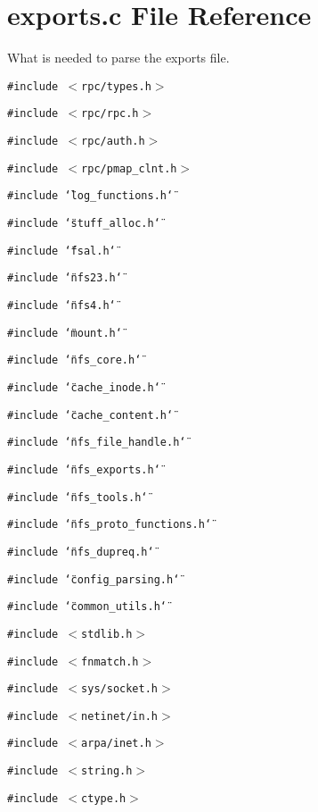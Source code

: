 \section{exports.c File Reference}
\label{exports_8c}
What is needed to parse the exports file. 

{\tt \#include $<$rpc/types.h$>$}\par
{\tt \#include $<$rpc/rpc.h$>$}\par
{\tt \#include $<$rpc/auth.h$>$}\par
{\tt \#include $<$rpc/pmap\_\-clnt.h$>$}\par
{\tt \#include \char`\"{}log\_\-functions.h\char`\"{}}\par
{\tt \#include \char`\"{}stuff\_\-alloc.h\char`\"{}}\par
{\tt \#include \char`\"{}fsal.h\char`\"{}}\par
{\tt \#include \char`\"{}nfs23.h\char`\"{}}\par
{\tt \#include \char`\"{}nfs4.h\char`\"{}}\par
{\tt \#include \char`\"{}mount.h\char`\"{}}\par
{\tt \#include \char`\"{}nfs\_\-core.h\char`\"{}}\par
{\tt \#include \char`\"{}cache\_\-inode.h\char`\"{}}\par
{\tt \#include \char`\"{}cache\_\-content.h\char`\"{}}\par
{\tt \#include \char`\"{}nfs\_\-file\_\-handle.h\char`\"{}}\par
{\tt \#include \char`\"{}nfs\_\-exports.h\char`\"{}}\par
{\tt \#include \char`\"{}nfs\_\-tools.h\char`\"{}}\par
{\tt \#include \char`\"{}nfs\_\-proto\_\-functions.h\char`\"{}}\par
{\tt \#include \char`\"{}nfs\_\-dupreq.h\char`\"{}}\par
{\tt \#include \char`\"{}config\_\-parsing.h\char`\"{}}\par
{\tt \#include \char`\"{}common\_\-utils.h\char`\"{}}\par
{\tt \#include $<$stdlib.h$>$}\par
{\tt \#include $<$fnmatch.h$>$}\par
{\tt \#include $<$sys/socket.h$>$}\par
{\tt \#include $<$netinet/in.h$>$}\par
{\tt \#include $<$arpa/inet.h$>$}\par
{\tt \#include $<$string.h$>$}\par
{\tt \#include $<$ctype.h$>$}\par
